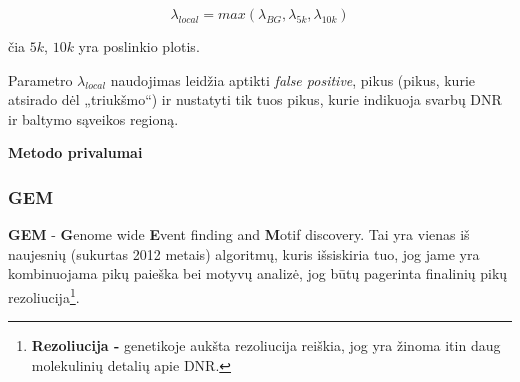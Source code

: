 \documentclass[12pt]{article}
\begin{document}
\begin{equation} \label{lambda_local}
    \lambda_{local} = max(\lambda_{BG}, \lambda_{5k}, \lambda_{10k})
\end{equation}

čia \(5k\), \(10k\) yra poslinkio plotis.

Parametro \(\lambda_{local}\) naudojimas leidžia aptikti \emph{false positive},
pikus (pikus, kurie atsirado dėl „triukšmo“) ir nustatyti tik tuos pikus,
kurie indikuoja svarbų DNR ir baltymo sąveikos regioną\cite{ARTICLE12}.

\textbf{Metodo privalumai} \newline
  
\subsubsection{GEM}
\textbf{GEM} - \textbf{G}enome wide \textbf{E}vent finding and \textbf{M}otif
discovery. Tai yra vienas iš naujesnių (sukurtas 2012 metais) algoritmų, kuris
išsiskiria tuo, jog jame yra kombinuojama pikų paieška bei motyvų analizė, jog
būtų pagerinta finalinių pikų rezoliucija\footnote{\textbf{Rezoliucija - }
genetikoje aukšta rezoliucija reiškia, jog yra žinoma itin daug molekulinių
detalių apie DNR.}.
\end{document}
